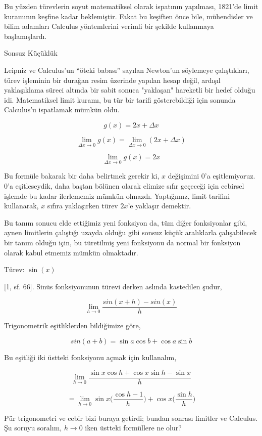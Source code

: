 \documentclass[12pt,fleqn]{article}\usepackage{../../common}
\begin{document}
Bu yüzden türevlerin soyut matematiksel olarak ispatının yapılması, 1821'de
limit kuramının keşfine kadar beklemiştir. Fakat bu keşiften önce bile,
mühendisler ve bilim adamları Calculus yöntemlerini verimli bir şekilde
kullanmaya başlamışlardı.

Sonsuz Küçüklük

Leipniz ve Calculus'un ``öteki babası'' sayılan Newton'un söylemeye
çalıştıkları, türev işleminin bir durağan resim üzerinde yapılan hesap
değil, ardışıl yaklaşıklama süreci altında bir sabit sonuca "yaklaşan"
hareketli bir hedef olduğu idi. Matematiksel limit kuramı, bu tür bir
tarifi gösterebildiği için sonunda Calculus'u ispatlamak mümkün oldu.

$$ g(x) = 2x + \Delta x $$

$$ \lim_{\Delta x \to 0}g(x) = \lim_{\Delta x \to 0} (2x + \Delta x)  $$

$$ \lim_{\Delta x \to 0}g(x) = 2x$$

Bu formüle bakarak bir daha belirtmek gerekir ki, $x$ değişimini 0'a
eşitlemiyoruz. 0'a eşitleseydik, daha baştan bölünen olarak elimize sıfır
geçeceği için cebirsel işlemde bu kadar ilerlememiz mümkün
olmazdı. Yaptığımız, limit tarifini kullanarak, $x$ sıfıra yaklaşırken
türev $2x$'e yaklaşır demektir.

Bu tanım sonucu elde ettiğimiz yeni fonksiyon da, tüm diğer fonksiyonlar
gibi, aynen limitlerin çalıştığı uzayda olduğu gibi sonsuz küçük
aralıklarla çalışabilecek bir tanım olduğu için, bu türetilmiş yeni
fonksiyonu da normal bir fonksiyon olarak kabul etmemiz mümkün olmaktadır.

Türev: $\sin(x)$

[1, sf. 66]. Sinüs fonksiyonunun türevi derken aslında kastedilen şudur,

$$ \lim_{h \to 0} \frac{sin(x+h) - sin(x)}{h} $$

Trigonometrik eşitliklerden bildiğimize göre, 

$$ sin(a+b) = \sin a \cos b + \cos a \sin b $$

Bu eşitliği iki üstteki fonksiyonu açmak için kullanalım,

$$ \lim_{h \to 0} \frac{\sin x \cos h + \cos x \sin h - \sin x }{h} $$

$$ = \lim_{h \to 0} \sin x \bigg( \frac{\cos h - 1}{h} \bigg) + \cos x \bigg( \frac{\sin h}{h} \bigg) $$

Pür trigonometri ve cebir bizi buraya getirdi; bundan sonrası limitler ve
Calculus. Şu soruyu soralım, $h \to 0$ iken üstteki formüllere ne olur? 
\end{document}
